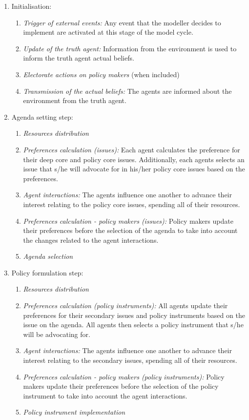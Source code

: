 \documentclass[11pt]{article}
\begin{document}
\begin{enumerate}
\item Initialisation:
	
	\begin{enumerate}
	\item \emph{Trigger of external events:} Any event that the modeller decides to implement are activated at this stage of the model cycle.
	\item \emph{Update of the truth agent:} Information from the environment is used to inform the truth agent actual beliefs.
	\item \emph{Electorate actions on policy makers} (when included)
	\item \emph{Transmission of the actual beliefs:} The agents are informed about the environment from the truth agent.
	\end{enumerate}
	
\item Agenda setting step:
	\begin{enumerate}
	\item \emph{Resources distribution}
	\item \emph{Preferences calculation (issues):} Each agent calculates the preference for their deep core and policy core issues. Additionally, each agents selects an issue that s/he will advocate for in his/her policy core issues based on the preferences.
	\item \emph{Agent interactions:} The agents influence one another to advance their interest relating to the policy core issues, spending all of their resources.
	\item \emph{Preferences calculation - policy makers (issues):} Policy makers update their preferences before the selection of the agenda to take into account the changes related to the agent interactions.
	\item \emph{Agenda selection}
	\end{enumerate}
	
\item Policy formulation step:
	\begin{enumerate}
	\item \emph{Resources distribution}
	\item \emph{Preferences calculation (policy instruments):} All agents update their preferences for their secondary issues and policy instruments based on the issue on the agenda. All agents then selects a policy instrument that s/he will be advocating for.
	\item \emph{Agent interactions:} The agents influence one another to advance their interest relating to the secondary issues, spending all of their resources.
	\item \emph{Preferences calculation - policy makers (policy instruments):} Policy makers update their preferences before the selection of the policy instrument to take into account the agent interactions.
	\item \emph{Policy instrument implementation} 
	\end{enumerate}

\end{enumerate}
\end{document}
